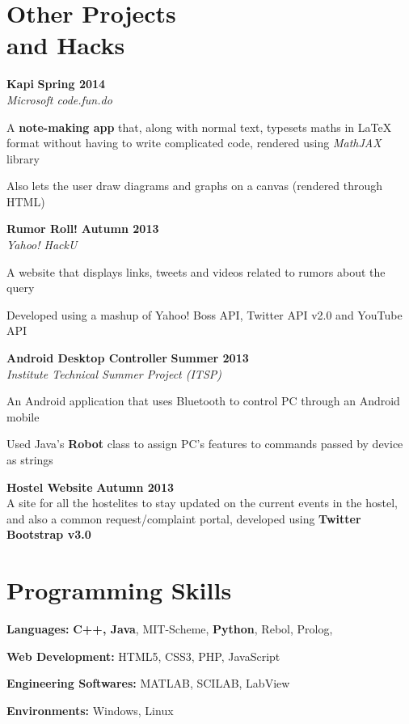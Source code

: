 \documentclass[margin,11pt]{resume}
\begin{document}
\begin{resume}
\section{\mysidestyle Other Projects \\ and Hacks}
\textbf{Kapi} \hfill \textbf{Spring 2014}\\
\textsl{Microsoft code.fun.do}
\begin{list2}
\item A \textbf{note-making app} that, along with normal text, typesets maths in \LaTeX{} format without having to write complicated code, rendered using \textsl{MathJAX} library
\item Also lets the user draw diagrams and graphs on a canvas (rendered through HTML)
\end{list2}
\vspace{-2.5mm}
\textbf{Rumor Roll!} \hfill \textbf{Autumn 2013}\\
\textsl{Yahoo! HackU}
\begin{list2}
\item A website that displays links, tweets and videos related to rumors about the query
\item Developed using a mashup of Yahoo! Boss API, Twitter API v2.0 and YouTube API
\end{list2}
\vspace{-2.5mm}
\textbf{Android Desktop Controller} \hfill \textbf{Summer 2013}\\
\textsl{Institute Technical Summer Project (ITSP)}
\begin{list2}
\item An Android application that uses Bluetooth to control PC through an Android mobile 
\item Used Java's \textbf{Robot} class to assign PC's features to commands passed by device as strings
\end{list2}
\vspace{-2.5mm}
\textbf{Hostel Website} \hfill \textbf{Autumn 2013}\\
A site for all the hostelites to stay updated on the current events in the hostel, and also a common request/complaint portal, developed using \textbf{Twitter Bootstrap v3.0}

\section{\mysidestyle Programming Skills}
\begin{list2}
\item \textbf{Languages:} \textbf{C++, Java}, MIT-Scheme, \textbf{Python}, Rebol, Prolog, \LaTeXe{}
\item \textbf{Web Development:} HTML5, CSS3, PHP, JavaScript
\item \textbf{Engineering Softwares:} MATLAB, SCILAB, LabView
\item \textbf{Environments:} Windows, Linux
\end{list2}


\end{resume}
\end{document}
